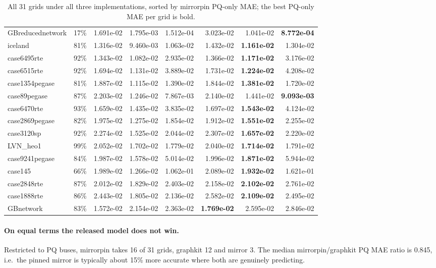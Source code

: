 \documentclass[10pt]{article}
\begin{document}
\begin{table}[H]
\begin{tabular}{lrrrrrrr}
GBreducednetwork & 17\% & 1.691e-02 & 1.795e-03 & 1.512e-04 & 3.023e-02 & 1.041e-02 & \textbf{8.772e-04} \\
iceland & 81\% & 1.316e-02 & 9.460e-03 & 1.063e-02 & 1.432e-02 & \textbf{1.161e-02} & 1.304e-02 \\
case6495rte & 92\% & 1.343e-02 & 1.082e-02 & 2.935e-02 & 1.366e-02 & \textbf{1.171e-02} & 3.176e-02 \\
case6515rte & 92\% & 1.694e-02 & 1.131e-02 & 3.889e-02 & 1.731e-02 & \textbf{1.224e-02} & 4.208e-02 \\
case1354pegase & 81\% & 1.887e-02 & 1.115e-02 & 1.390e-02 & 1.844e-02 & \textbf{1.381e-02} & 1.720e-02 \\
case89pegase & 87\% & 2.203e-02 & 1.246e-02 & 7.867e-03 & 2.140e-02 & 1.441e-02 & \textbf{9.093e-03} \\
case6470rte & 93\% & 1.659e-02 & 1.435e-02 & 3.835e-02 & 1.697e-02 & \textbf{1.543e-02} & 4.124e-02 \\
case2869pegase & 82\% & 1.975e-02 & 1.275e-02 & 1.854e-02 & 1.912e-02 & \textbf{1.551e-02} & 2.255e-02 \\
case3120sp & 92\% & 2.274e-02 & 1.525e-02 & 2.044e-02 & 2.307e-02 & \textbf{1.657e-02} & 2.220e-02 \\
LVN\_heo1 & 99\% & 2.052e-02 & 1.702e-02 & 1.779e-02 & 2.040e-02 & \textbf{1.714e-02} & 1.791e-02 \\
case9241pegase & 84\% & 1.987e-02 & 1.578e-02 & 5.014e-02 & 1.996e-02 & \textbf{1.871e-02} & 5.944e-02 \\
case145 & 66\% & 1.989e-02 & 1.266e-02 & 1.062e-01 & 2.089e-02 & \textbf{1.932e-02} & 1.621e-01 \\
case2848rte & 87\% & 2.012e-02 & 1.829e-02 & 2.403e-02 & 2.158e-02 & \textbf{2.102e-02} & 2.761e-02 \\
case1888rte & 86\% & 2.443e-02 & 1.805e-02 & 2.136e-02 & 2.582e-02 & \textbf{2.109e-02} & 2.495e-02 \\
GBnetwork & 83\% & 1.572e-02 & 2.154e-02 & 2.363e-02 & \textbf{1.769e-02} & 2.595e-02 & 2.846e-02 \\
\bottomrule
\end{tabular}
\caption{All 31 grids under all three implementations, sorted by mirrorpin
PQ-only MAE; the best PQ-only MAE per grid is bold.}
\end{table}

\paragraph{On equal terms the released model does not win.} Restricted to PQ
buses, mirrorpin takes 16 of 31 grids, graphkit 12 and mirror 3. The median
mirrorpin/graphkit PQ MAE ratio is 0.845, i.e.\ the pinned mirror is typically
about 15\% more accurate where both are genuinely predicting.
\end{document}
